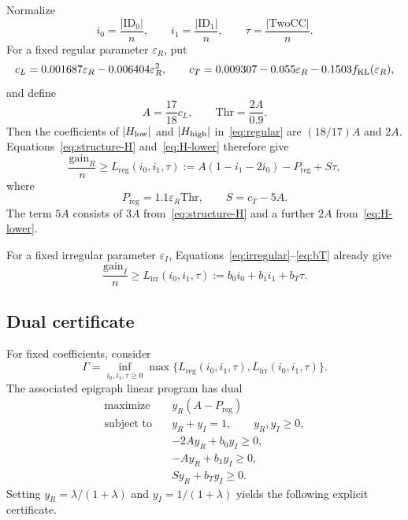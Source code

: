 \documentclass[11pt]{article}
\newcommand{\TwoCC}{\mathrm{TwoCC}}
\newcommand{\ID}{\mathrm{ID}}
\newcommand{\eps}{\varepsilon}
\newcommand{\gain}{\mathrm{gain}}
\newcommand{\Thr}{\mathrm{Thr}}
\newcommand{\Lreg}{L_{\mathrm{reg}}}
\newcommand{\Lirr}{L_{\mathrm{irr}}}
\newcommand{\Preg}{P_{\mathrm{reg}}}
\begin{document}
Normalize
\[
 i_0=\frac{|\ID_0|}{n},
 \qquad
 i_1=\frac{|\ID_1|}{n},
 \qquad
 \tau=\frac{|\TwoCC|}{n}.
\]
For a fixed regular parameter $\eps_R$, put
\[
 c_L=0.001687\eps_R-0.006404\eps_R^2,
 \qquad
 c_T=0.009307-0.055\eps_R-0.1503f_{\rm KL}(\eps_R),
\]
and define
\begin{equation}\label{eq:AThr}
 A=\frac{17}{18}c_L,
 \qquad
 \Thr=\frac{2A}{0.9}.
\end{equation}
Then the coefficients of $|H_{\rm low}|$ and $|H_{\rm high}|$ in~\eqref{eq:regular} are $(18/17)A$ and $2A$.  Equations~\eqref{eq:structure-H} and~\eqref{eq:H-lower} therefore give
\begin{equation}\label{eq:Rlinear}
 \frac{\gain_R}{n}
 \ge
 \Lreg(i_0,i_1,\tau)
 :=A(1-i_1-2i_0)-\Preg+S\tau,
\end{equation}
where
\begin{equation}\label{eq:pS}
 \Preg=1.1\eps_R\Thr,
 \qquad
 S=c_T-5A.
\end{equation}
The term $5A$ consists of $3A$ from~\eqref{eq:structure-H} and a further $2A$ from~\eqref{eq:H-lower}.

For a fixed irregular parameter $\eps_I$, Equations~\eqref{eq:irregular}--\eqref{eq:bT} already give
\begin{equation}\label{eq:Ilinear}
 \frac{\gain_I}{n}
 \ge
 \Lirr(i_0,i_1,\tau)
 :=b_0i_0+b_1i_1+b_T\tau.
\end{equation}

\subsection{Dual certificate}

For fixed coefficients, consider
\begin{equation}\label{eq:minimax}
 \Gamma=
 \inf_{i_0,i_1,\tau\ge0}
 \max\{\Lreg(i_0,i_1,\tau),\Lirr(i_0,i_1,\tau)\}.
\end{equation}
The associated epigraph linear program has dual
\begin{equation}\label{eq:dual-lp}
\begin{aligned}
 \text{maximize}\quad &y_R(A-\Preg)\\
 \text{subject to}\quad
 &y_R+y_I=1,
 \qquad y_R,y_I\ge0,\\
 &-2Ay_R+b_0y_I\ge0,\\
 &-Ay_R+b_1y_I\ge0,\\
 &Sy_R+b_Ty_I\ge0.
\end{aligned}
\end{equation}
Setting $y_R=\lambda/(1+\lambda)$ and $y_I=1/(1+\lambda)$ yields the following explicit certificate.
\end{document}
